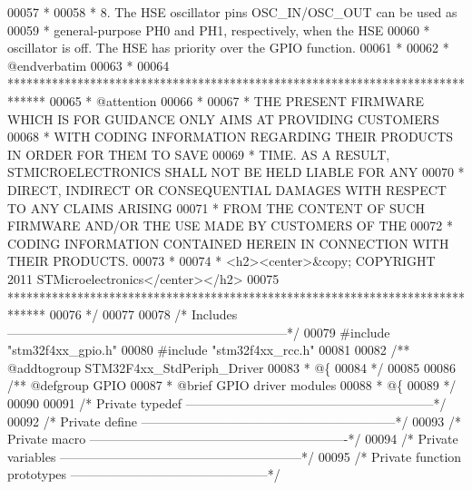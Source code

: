 \begin{DoxyCode}
00057 \textcolor{comment}{  *}
00058 \textcolor{comment}{  *          8. The HSE oscillator pins OSC\_IN/OSC\_OUT can be used as }
00059 \textcolor{comment}{  *             general-purpose PH0 and PH1, respectively, when the HSE }
00060 \textcolor{comment}{  *             oscillator is off. The HSE has priority over the GPIO function.}
00061 \textcolor{comment}{  *             }
00062 \textcolor{comment}{  *  @endverbatim        }
00063 \textcolor{comment}{  *}
00064 \textcolor{comment}{  ******************************************************************************}
00065 \textcolor{comment}{  * @attention}
00066 \textcolor{comment}{  *}
00067 \textcolor{comment}{  * THE PRESENT FIRMWARE WHICH IS FOR GUIDANCE ONLY AIMS AT PROVIDING CUSTOMERS}
00068 \textcolor{comment}{  * WITH CODING INFORMATION REGARDING THEIR PRODUCTS IN ORDER FOR THEM TO SAVE}
00069 \textcolor{comment}{  * TIME. AS A RESULT, STMICROELECTRONICS SHALL NOT BE HELD LIABLE FOR ANY}
00070 \textcolor{comment}{  * DIRECT, INDIRECT OR CONSEQUENTIAL DAMAGES WITH RESPECT TO ANY CLAIMS ARISING}
00071 \textcolor{comment}{  * FROM THE CONTENT OF SUCH FIRMWARE AND/OR THE USE MADE BY CUSTOMERS OF THE}
00072 \textcolor{comment}{  * CODING INFORMATION CONTAINED HEREIN IN CONNECTION WITH THEIR PRODUCTS.}
00073 \textcolor{comment}{  *}
00074 \textcolor{comment}{  * <h2><center>&copy; COPYRIGHT 2011 STMicroelectronics</center></h2>}
00075 \textcolor{comment}{  ******************************************************************************}
00076 \textcolor{comment}{  */}
00077 
00078 \textcolor{comment}{/* Includes ------------------------------------------------------------------*/}
00079 \textcolor{preprocessor}{#}\textcolor{preprocessor}{include} "stm32f4xx_gpio.h"
00080 \textcolor{preprocessor}{#}\textcolor{preprocessor}{include} "stm32f4xx_rcc.h"
00081 
00082 \textcolor{comment}{/** @addtogroup STM32F4xx\_StdPeriph\_Driver}
00083 \textcolor{comment}{  * @\{}
00084 \textcolor{comment}{  */}
00085 
00086 \textcolor{comment}{/** @defgroup GPIO }
00087 \textcolor{comment}{  * @brief GPIO driver modules}
00088 \textcolor{comment}{  * @\{}
00089 \textcolor{comment}{  */}
00090 
00091 \textcolor{comment}{/* Private typedef -----------------------------------------------------------*/}
00092 \textcolor{comment}{/* Private define ------------------------------------------------------------*/}
00093 \textcolor{comment}{/* Private macro -------------------------------------------------------------*/}
00094 \textcolor{comment}{/* Private variables ---------------------------------------------------------*/}
00095 \textcolor{comment}{/* Private function prototypes -----------------------------------------------*/}

\end{DoxyCode}
